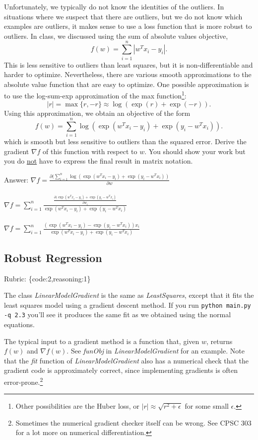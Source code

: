 \documentclass{article}
\def\rubric#1{\gre{Rubric: \{#1\}}}{}
\def\blu#1{{\color{blu}#1}}
\def\gre#1{{\color{gre}#1}}
\begin{document}
Unfortunately, we typically do not know the identities of the outliers. In situations where we suspect that there are outliers, but we do not know which examples are outliers, it makes sense to use a loss function that is more robust to outliers. In class, we discussed using the sum of absolute values objective,
\[
f(w) = \sum_{i=1}^n |w^Tx_i - y_i|.
\]
This is less sensitive to outliers than least squares, but it is non-differentiable and harder to optimize. Nevertheless, there are various smooth approximations to the absolute value function that are easy to optimize. One possible approximation is to use the log-sum-exp approximation of the max function\footnote{Other possibilities are the Huber loss, or $|r|\approx \sqrt{r^2+\epsilon}$ for some small $\epsilon$.}:
\[
|r| = \max\{r, -r\} \approx \log(\exp(r) + \exp(-r)).
\]
Using this approximation, we obtain an objective of the form
\[
f(w) {=} \sum_{i=1}^n  \log\left(\exp(w^Tx_i - y_i) + \exp(y_i - w^Tx_i)\right).
\]
which is smooth but less sensitive to outliers than the squared error. \blu{Derive
 the gradient $\nabla f$ of this function with respect to $w$. You should show your work but you do \underline{not} have to express the final result in matrix notation.}

\blu{Answer:} $\nabla f = \frac{\partial( \sum_{i=1}^n  \log\left(\exp(w^Tx_i - y_i) + \exp(y_i - w^Tx_i)\right )}{\partial w}$ \\ \\
 $\nabla f = \sum_{i=1}^n \frac{\frac{\partial(\exp(w^Tx_i - y_i) + \exp(y_i - w^Tx_i)}{\partial w_i}}{\exp(w^Tx_i - y_i) + \exp(y_i - w^Tx_i)}$ \\ \\
 $\nabla f =\sum_{i=1}^n \frac{(\exp(w^Tx_i - y_i) - \exp(y_i - w^Tx_i))x_i}{\exp(w^Tx_i - y_i) + \exp(y_i - w^Tx_i)} $

\subsection{Robust Regression}
\rubric{code:2,reasoning:1}

The class \emph{LinearModelGradient} is the same as \emph{LeastSquares}, except that it fits the least squares model using a gradient descent method. If you run \verb|python main.py -q 2.3| you'll see it produces the same fit as we obtained using the normal equations.

The typical input to a gradient method is a function that, given $w$, returns $f(w)$ and $\nabla f(w)$. See \emph{funObj} in \emph{LinearModelGradient} for an example. Note that the \emph{fit} function of \emph{LinearModelGradient} also has a numerical check that the gradient code is approximately correct, since implementing gradients is often error-prone.\footnote{Sometimes the numerical gradient checker itself can be wrong. See CPSC 303 for a lot more on numerical differentiation.}
\end{document}
